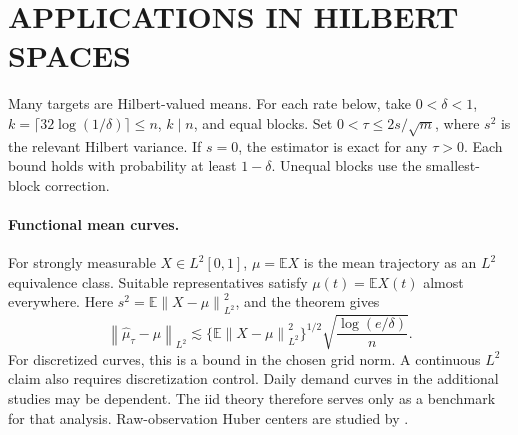 \documentclass[twoside]{article}
\theoremstyle{definition}
\newcommand{\E}{\mathbb E}
\newcommand{\norm}[1]{\left\lVert #1\right\rVert}
\begin{document}
\section{APPLICATIONS IN HILBERT SPACES}\label{sec:applications}

Many targets are Hilbert-valued means. For each rate below, take $0<\delta<1$, $k=\lceil32\log(1/\delta)\rceil\le n$, $k\mid n$, and equal blocks. Set $0<\tau\le2s/\sqrt m$, where $s^2$ is the relevant Hilbert variance. If $s=0$, the estimator is exact for any $\tau>0$. Each bound holds with probability at least $1-\delta$. Unequal blocks use the smallest-block correction.

\paragraph{Functional mean curves.}
For strongly measurable $X\in L^2[0,1]$, $\mu=\E X$ is the mean trajectory as an $L^2$ equivalence class. Suitable representatives satisfy $\mu(t)=\E X(t)$ almost everywhere. Here $s^2=\E\norm{X-\mu}_{L^2}^2$, and the theorem gives
\[
    \norm{\hat\mu_\tau-\mu}_{L^2}
    \lesssim
    \{\E\norm{X-\mu}_{L^2}^2\}^{1/2}
    \sqrt{\frac{\log(e/\delta)}{n}}.
\]
For discretized curves, this is a bound in the chosen grid norm. A continuous $L^2$ claim also requires discretization control. Daily demand curves in the additional studies may be dependent. The iid theory therefore serves only as a benchmark for that analysis. Raw-observation Huber centers are studied by \citet{sinova_2018_MestimatorsLocationFunctional}.
\end{document}

